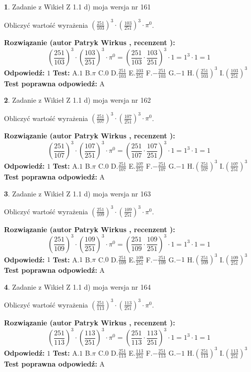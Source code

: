 \documentclass[12pt, a4paper]{article}
\theoremstyle{definition} %
\newtheorem{zad}{}
\newcommand{\zadStart}[1]{\begin{zad}#1\newline}
\newcommand{\zadStop}{\end{zad}}
\newcommand{\rozwStart}[2]{\noindent \textbf{Rozwiązanie (autor #1 , recenzent #2): }\newline}
\newcommand{\rozwStop}{\newline}
\newcommand{\odpStart}{\noindent \textbf{Odpowiedź:}\newline}
\newcommand{\odpStop}{\newline}
\newcommand{\testStart}{\noindent \textbf{Test:}\newline}
\newcommand{\testStop}{\newline}
\newcommand{\kluczStart}{\noindent \textbf{Test poprawna odpowiedź:}\newline}
\newcommand{\kluczStop}{\newline}
\begin{document}
\zadStart{Zadanie z Wikieł Z 1.1 d) moja wersja nr 161}

Obliczyć wartość wyrażenia $(\frac{251}{103})^{3} \cdot (\frac{103}{251})^{3} \cdot \pi^{0}$.
\zadStop
\rozwStart{Patryk Wirkus}{}
$$(\frac{251}{103})^{3} \cdot (\frac{103}{251})^{3} \cdot \pi^{0} = (\frac{251}{103} \cdot \frac{103}{251})^{3} \cdot 1 = 1^{3} \cdot 1 = 1$$
\rozwStop
\odpStart
$1$
\odpStop
\testStart
A.$1$ B.$\pi$ C.$0$ D.$\frac{251}{103}$ E.$\frac{103}{251}$
F.$-\frac{251}{103}$ G.$-1$
H.$(\frac{251}{103})^{3}$
I.$(\frac{103}{251})^{3}$
\testStop
\kluczStart
A
\kluczStop



\zadStart{Zadanie z Wikieł Z 1.1 d) moja wersja nr 162}

Obliczyć wartość wyrażenia $(\frac{251}{107})^{3} \cdot (\frac{107}{251})^{3} \cdot \pi^{0}$.
\zadStop
\rozwStart{Patryk Wirkus}{}
$$(\frac{251}{107})^{3} \cdot (\frac{107}{251})^{3} \cdot \pi^{0} = (\frac{251}{107} \cdot \frac{107}{251})^{3} \cdot 1 = 1^{3} \cdot 1 = 1$$
\rozwStop
\odpStart
$1$
\odpStop
\testStart
A.$1$ B.$\pi$ C.$0$ D.$\frac{251}{107}$ E.$\frac{107}{251}$
F.$-\frac{251}{107}$ G.$-1$
H.$(\frac{251}{107})^{3}$
I.$(\frac{107}{251})^{3}$
\testStop
\kluczStart
A
\kluczStop



\zadStart{Zadanie z Wikieł Z 1.1 d) moja wersja nr 163}

Obliczyć wartość wyrażenia $(\frac{251}{109})^{3} \cdot (\frac{109}{251})^{3} \cdot \pi^{0}$.
\zadStop
\rozwStart{Patryk Wirkus}{}
$$(\frac{251}{109})^{3} \cdot (\frac{109}{251})^{3} \cdot \pi^{0} = (\frac{251}{109} \cdot \frac{109}{251})^{3} \cdot 1 = 1^{3} \cdot 1 = 1$$
\rozwStop
\odpStart
$1$
\odpStop
\testStart
A.$1$ B.$\pi$ C.$0$ D.$\frac{251}{109}$ E.$\frac{109}{251}$
F.$-\frac{251}{109}$ G.$-1$
H.$(\frac{251}{109})^{3}$
I.$(\frac{109}{251})^{3}$
\testStop
\kluczStart
A
\kluczStop



\zadStart{Zadanie z Wikieł Z 1.1 d) moja wersja nr 164}

Obliczyć wartość wyrażenia $(\frac{251}{113})^{3} \cdot (\frac{113}{251})^{3} \cdot \pi^{0}$.
\zadStop
\rozwStart{Patryk Wirkus}{}
$$(\frac{251}{113})^{3} \cdot (\frac{113}{251})^{3} \cdot \pi^{0} = (\frac{251}{113} \cdot \frac{113}{251})^{3} \cdot 1 = 1^{3} \cdot 1 = 1$$
\rozwStop
\odpStart
$1$
\odpStop
\testStart
A.$1$ B.$\pi$ C.$0$ D.$\frac{251}{113}$ E.$\frac{113}{251}$
F.$-\frac{251}{113}$ G.$-1$
H.$(\frac{251}{113})^{3}$
I.$(\frac{113}{251})^{3}$
\testStop
\kluczStart
A
\kluczStop
\end{document}
